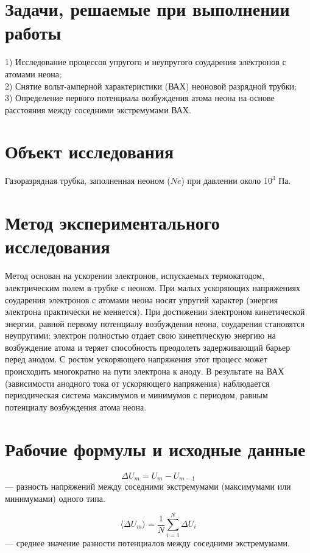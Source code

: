 \documentclass[a4paper,12pt]{article}
\begin{document}
\section{Задачи, решаемые при выполнении работы}
1) Исследование процессов упругого и неупругого соударения электронов с атомами неона; \\
2) Снятие вольт-амперной характеристики (ВАХ) неоновой разрядной трубки; \\
3) Определение первого потенциала возбуждения атома неона на основе расстояния между соседними экстремумами ВАХ.

\section{Объект исследования}
Газоразрядная трубка, заполненная неоном ($Ne$) при давлении около $10^3$ Па.

\section{Метод экспериментального исследования}
Метод основан на ускорении электронов, испускаемых термокатодом, электрическим полем в трубке с неоном. При малых ускоряющих напряжениях соударения электронов с атомами неона носят упругий характер (энергия электрона практически не меняется). При достижении электроном кинетической энергии, равной первому потенциалу возбуждения неона, соударения становятся неупругими: электрон полностью отдает свою кинетическую энергию на возбуждение атома и теряет способность преодолеть задерживающий барьер перед анодом. С ростом ускоряющего напряжения этот процесс может происходить многократно на пути электрона к аноду. В результате на ВАХ (зависимости анодного тока от ускоряющего напряжения) наблюдается периодическая система максимумов и минимумов с периодом, равным потенциалу возбуждения атома неона.

\section{Рабочие формулы и исходные данные}

\begin{equation}
\Delta U_m = U_m - U_{m-1} \tag{1}
\end{equation}
— разность напряжений между соседними экстремумами (максимумами или минимумами) одного типа.

\begin{equation}
\langle \Delta U_m \rangle = \frac{1}{N} \sum_{i=1}^N \Delta U_i \tag{2}
\end{equation}
— среднее значение разности потенциалов между соседними экстремумами.
\end{document}
